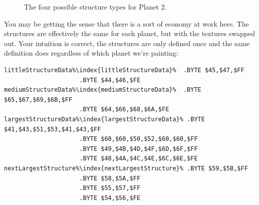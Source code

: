 \begin{figure}[H]
  {
    \setlength{\tabcolsep}{3.0pt}
    \setlength\cmidrulewidth{\heavyrulewidth} %
    \begin{adjustbox}{width=15cm,center}
      \begin{subfigure}{0.3\textwidth}
        
      \end{subfigure}
      \begin{subfigure}{0.3\textwidth}
        
      \end{subfigure}
      \begin{subfigure}{0.3\textwidth}
        
      \end{subfigure}
      \begin{subfigure}{0.3\textwidth}
        
      \end{subfigure}
    \end{adjustbox}
  }\caption[]{The four possible structure types for Planet 2.}
\end{figure}

You may be getting the sense that there is a sort of economy at work here. The structures are effectively
the same for each planet, but with the textures swapped out. Your intuition is correct, the structures
are only defined once and the same definition does regardless of which planet we're painting:

\begin{lstlisting}[caption=The definitions of three of the structures\index{structures} above\, each of which serves all five planets.,escapechar=\%]
littleStructureData%\index{littleStructureData}%  .BYTE $45,$47,$FF
                     .BYTE $44,$46,$FE
mediumStructureData%\index{mediumStructureData}%  .BYTE $65,$67,$69,$6B,$FF
                     .BYTE $64,$66,$68,$6A,$FE
largestStructureData%\index{largestStructureData}% .BYTE $41,$43,$51,$53,$41,$43,$FF
                     .BYTE $60,$60,$50,$52,$60,$60,$FF
                     .BYTE $49,$4B,$4D,$4F,$6D,$6F,$FF
                     .BYTE $48,$4A,$4C,$4E,$6C,$6E,$FE
nextLargestStructure%\index{nextLargestStructure}% .BYTE $59,$5B,$FF
                     .BYTE $58,$5A,$FF
                     .BYTE $55,$57,$FF
                     .BYTE $54,$56,$FE
\end{lstlisting}

